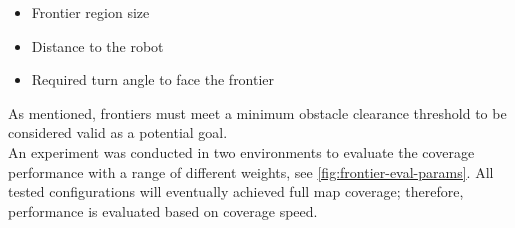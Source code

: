 \begin{itemize}
  \item Frontier region size
  \item Distance to the robot
  \item Required turn angle to face the frontier
\end{itemize}

As mentioned, frontiers must meet a minimum obstacle clearance threshold to be considered valid as a potential goal.\\

An experiment was conducted in two environments to evaluate the coverage performance with a range of different weights, see \cref{fig:frontier-eval-params}. 
All tested configurations will eventually achieved full map coverage; therefore, performance is evaluated based on coverage speed.
